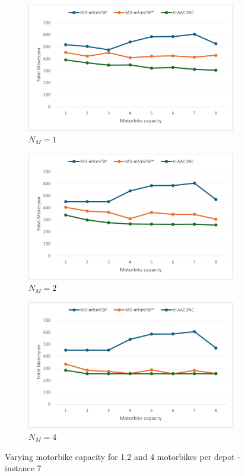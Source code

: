 \documentclass{article}
\begin{document}
	\begin{figure}[h]
		\centering
		\begin{subfigure}{0.33\textwidth}
			\centering
			\includegraphics[scale=0.42]{p07_NM1}\;
			\caption{$N_M=1$}
			\label{fig:p07_NM1}
		\end{subfigure}
		\begin{subfigure}{0.33\textwidth}
			\centering
			\includegraphics[scale=0.42]{p07_NM2}\;
			\caption{$N_M=2$}
			\label{fig:p07_NM2}
		\end{subfigure}
		\begin{subfigure}{0.33\textwidth}
			\centering
			\includegraphics[scale=0.42]{p07_NM4}\;
			\caption{$N_M=4$}
			\label{fig:p07_NM4}
		\end{subfigure}
		\caption{Varying motorbike capacity for 1,2 and 4 motorbikes per depot - instance 7}
		\label{fig:motorbike_exp_p07}
	\end{figure}
	
\end{document}
